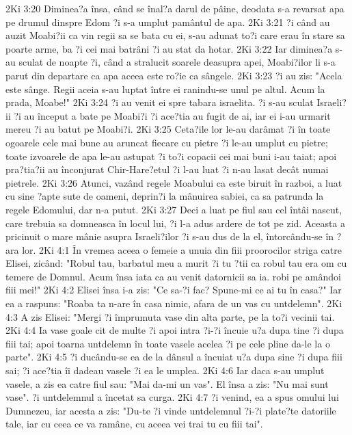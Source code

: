 2Ki 3:20  Diminea?a însa, când se înal?a darul de pâine, deodata s-a revarsat apa pe drumul dinspre Edom ?i s-a umplut pamântul de apa.
2Ki 3:21  ?i când au auzit Moabi?ii ca vin regii sa se bata cu ei, s-au adunat to?i care erau în stare sa poarte arme, ba ?i cei mai batrâni ?i au stat da hotar.
2Ki 3:22  Iar diminea?a s-au sculat de noapte ?i, când a stralucit soarele deasupra apei, Moabi?ilor li s-a parut din departare ca apa aceea este ro?ie ca sângele.
2Ki 3:23  ?i au zis: "Acela este sânge. Regii aceia s-au luptat între ei ranindu-se unul pe altul. Acum la prada, Moabe!"
2Ki 3:24  ?i au venit ei spre tabara israelita. ?i s-au sculat Israeli?ii ?i au început a bate pe Moabi?i ?i ace?tia au fugit de ai, iar ei i-au urmarit mereu ?i au batut pe Moabi?i.
2Ki 3:25  Ceta?ile lor le-au darâmat ?i în toate ogoarele cele mai bune au aruncat fiecare cu pietre ?i le-au umplut cu pietre; toate izvoarele de apa le-au astupat ?i to?i copacii cei mai buni i-au taiat; apoi pra?tia?ii au înconjurat Chir-Hare?etul ?i l-au luat ?i n-au lasat decât numai pietrele.
2Ki 3:26  Atunci, vazând regele Moabului ca este biruit în razboi, a luat cu sine ?apte sute de oameni, deprin?i la mânuirea sabiei, ca sa patrunda la regele Edomului, dar n-a putut.
2Ki 3:27  Deci a luat pe fiul sau cel întâi nascut, care trebuia sa domneasca în locul lui, ?i l-a adus ardere de tot pe zid. Aceasta a pricinuit o mare mânie asupra Israeli?ilor ?i s-au dus de la el, întorcându-se în ?ara lor.
2Ki 4:1  În vremea aceea o femeie a unuia din fiii proorocilor striga catre Elisei, zicând: "Robul tau, barbatul meu a murit ?i tu ?tii ca robul tau era om cu temere de Domnul. Acum însa iata ca au venit datornicii sa ia. robi pe amândoi fiii mei!"
2Ki 4:2  Elisei însa i-a zis: "Ce sa-?i fac? Spune-mi ce ai tu în casa?" Iar ea a raspuns: "Roaba ta n-are în casa nimic, afara de un vas cu untdelemn".
2Ki 4:3  A zis Elisei: "Mergi ?i împrumuta vase din alta parte, pe la to?i vecinii tai.
2Ki 4:4  Ia vase goale cit de multe ?i apoi intra ?i-?i încuie u?a dupa tine ?i dupa fiii tai; apoi toarna untdelemn în toate vasele acelea ?i pe cele pline da-le la o parte".
2Ki 4:5  ?i ducându-se ea de la dânsul a încuiat u?a dupa sine ?i dupa fiii sai; ?i ace?tia îi dadeau vasele ?i ea le umplea.
2Ki 4:6  Iar daca s-au umplut vasele, a zis ea catre fiul sau: "Mai da-mi un vas". El însa a zis: "Nu mai sunt vase". ?i untdelemnul a încetat sa curga.
2Ki 4:7  ?i venind, ea a spus omului lui Dumnezeu, iar acesta a zis: "Du-te ?i vinde untdelemnul ?i-?i plate?te datoriile tale, iar cu ceea ce va ramâne, cu aceea vei trai tu cu fiii tai".
